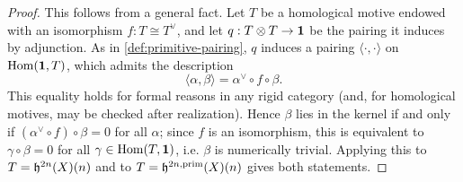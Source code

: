 \begin{proof}
  This follows from a general fact. Let \(T\) be a homological motive endowed
  with an isomorphism \(f : T \cong T^\vee\), and let
  \(q : T \otimes T \to \mathbf{1}\) be the pairing it induces by adjunction. As in
  \cref{def:primitive-pairing}, \(q\) induces a pairing
  \(\langle \cdot, \cdot \rangle\) on \(\mathrm{Hom}(\mathbf{1}, T)\), which admits the
  description
  \[\langle \alpha, \beta \rangle = \alpha^\vee \circ f \circ \beta.\]
  This equality holds for formal reasons in any rigid category (and, for
  homological motives, may be checked after realization). Hence \(\beta\) lies in
  the kernel if and only if \((\alpha^\vee \circ f) \circ \beta = 0\) for all
  \(\alpha\); since \(f\) is an isomorphism, this is equivalent to
  \(\gamma \circ \beta = 0\) for all \(\gamma \in \mathrm{Hom}(T, \mathbf{1})\), i.e. \(\beta\)
  is numerically trivial. Applying this to \(T = \mathfrak{h}^{2n}(X)(n)\) and to
  \(T = \mathfrak{h}^{2n,\mathrm{prim}}(X)(n)\) gives both statements.
\end{proof}

